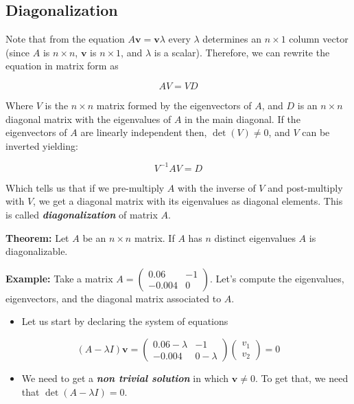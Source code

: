 \documentclass[11pt]{article}
\providecommand{\tightlist}{%
      \setlength{\itemsep}{0pt}\setlength{\parskip}{0pt}}
\begin{document}
    \hypertarget{diagonalization}{%
\subsection{Diagonalization}\label{diagonalization}}

Note that from the equation \(A\mathbf{v} = \mathbf{v}\lambda\) every
\(\lambda\) determines an \(n\times 1\) column vector (since \(A\) is
\(n\times n\), \(\mathbf{v}\) is \(n\times 1\), and \(\lambda\) is a
scalar). Therefore, we can rewrite the equation in matrix form as

\[
AV = VD
\]

Where \(V\) is the \(n\times n\) matrix formed by the eigenvectors of
\(A\), and \(D\) is an \(n\times n\) diagonal matrix with the
eigenvalues of \(A\) in the main diagonal. If the eigenvectors of \(A\)
are linearly independent then, \(\det(V) \neq 0\), and \(V\) can be
inverted yielding:

\[
V^{-1}AV = D
\]

Which tells us that if we pre-multiply \(A\) with the inverse of \(V\)
and post-multiply with \(V\), we get a diagonal matrix with its
eigenvalues as diagonal elements. This is called
\textbf{\emph{diagonalization}} of matrix \(A\).

\textbf{Theorem:} Let \(A\) be an \(n\times n\) matrix. If \(A\) has
\(n\) distinct eigenvalues \(A\) is diagonalizable.

\textbf{Example:} Take a matrix
\(A = \begin{pmatrix} 0.06 & -1 \\ -0.004 & 0 \end{pmatrix}\). Let's
compute the eigenvalues, eigenvectors, and the diagonal matrix
associated to \(A\).

\begin{itemize}
\tightlist
\item
  Let us start by declaring the system of equations
\end{itemize}

\[
(A - \lambda I) \mathbf{v} = \begin{pmatrix} 0.06 - \lambda & -1 \\ -0.004 & 0 - \lambda \end{pmatrix} \begin{pmatrix} v_1 \\ v_2 \end{pmatrix} = 0
\]

\begin{itemize}
\tightlist
\item
  We need to get a \textbf{\emph{non trivial solution}} in which
  \(\mathbf{v}\neq 0\). To get that, we need that
  \(\det(A-\lambda I) = 0\).
\end{itemize}
\end{document}
